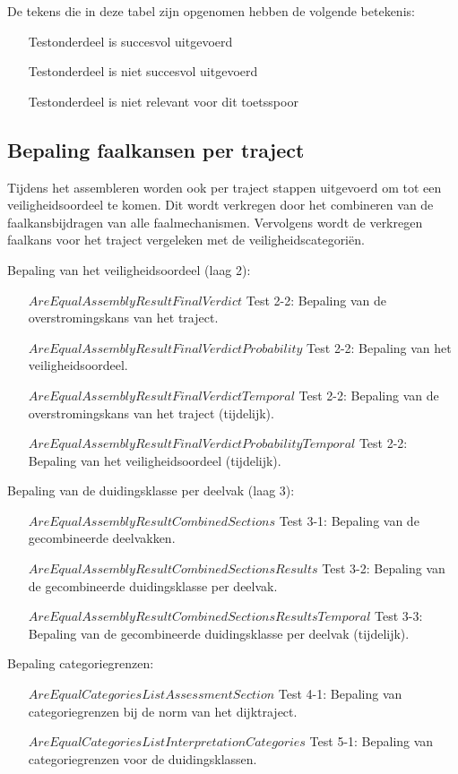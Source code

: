 De tekens die in deze tabel zijn opgenomen hebben de volgende betekenis:
\begin{itemize}
	\item [\cmark] Testonderdeel is succesvol uitgevoerd
	\item [\xmark] Testonderdeel is niet succesvol uitgevoerd
	\item [\nmark] Testonderdeel is niet relevant voor dit toetsspoor
\end{itemize}

\subsection{Bepaling faalkansen per traject}
	\label{sec:$Order$:pertraject}
Tijdens het assembleren worden ook per traject stappen uitgevoerd om tot een veiligheidsoordeel te komen. Dit wordt verkregen door het combineren van de faalkansbijdragen van alle faalmechanismen. Vervolgens wordt de verkregen faalkans voor het traject vergeleken met de veiligheidscategori\"en.

Bepaling van het veiligheidsoordeel (laag 2):
\begin{itemize}
	\item [$AreEqualAssemblyResultFinalVerdict$]Test 2-2: Bepaling van de overstromingskans van het traject.
	\item [$AreEqualAssemblyResultFinalVerdictProbability$]Test 2-2: Bepaling van het veiligheidsoordeel.
	\item [$AreEqualAssemblyResultFinalVerdictTemporal$]Test 2-2: Bepaling van de overstromingskans van het traject (tijdelijk).
	\item [$AreEqualAssemblyResultFinalVerdictProbabilityTemporal$]Test 2-2: Bepaling van het veiligheidsoordeel (tijdelijk).
\end{itemize}

Bepaling van de duidingsklasse per deelvak (laag 3):
\begin{itemize}
	\item [$AreEqualAssemblyResultCombinedSections$] Test 3-1: Bepaling van de gecombineerde deelvakken.
	\item [$AreEqualAssemblyResultCombinedSectionsResults$] Test 3-2: Bepaling van de gecombineerde duidingsklasse per deelvak.
	\item [$AreEqualAssemblyResultCombinedSectionsResultsTemporal$] Test 3-3: Bepaling van de gecombineerde duidingsklasse per deelvak (tijdelijk).
\end{itemize}

Bepaling categoriegrenzen:
\begin{itemize}
	\item [$AreEqualCategoriesListAssessmentSection$]Test 4-1: Bepaling van categoriegrenzen bij de norm van het dijktraject.
	\item [$AreEqualCategoriesListInterpretationCategories$]Test 5-1: Bepaling van categoriegrenzen voor de duidingsklassen.
\end{itemize}
